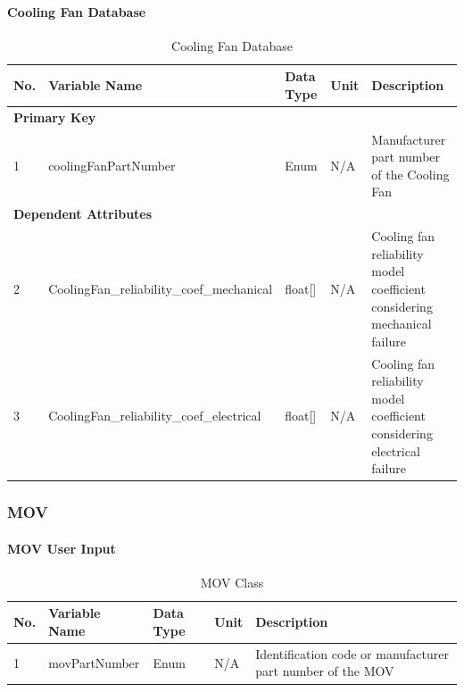 \documentclass{article}
\begin{document}
\paragraph{Cooling Fan Database}
\begin{table}[h]
\centering
\caption{Cooling Fan Database}
\begin{tabular}{|l|l|l|l|p{6cm}|}
\hline
\textbf{No.} & \textbf{Variable Name} & \textbf{Data Type} & \textbf{Unit} & \textbf{Description} \\ \hline
\multicolumn{5}{|l|}{\textbf{Primary Key}} \\ \hline
1 & coolingFanPartNumber & Enum & N/A & Manufacturer part number of the Cooling Fan \\ \hline
\multicolumn{5}{|l|}{\textbf{Dependent Attributes}} \\ \hline
2 & CoolingFan\_reliability\_coef\_mechanical & float[] & N/A & Cooling fan reliability model coefficient considering mechanical failure \\ \hline
3 & CoolingFan\_reliability\_coef\_electrical & float[] & N/A & Cooling fan reliability model coefficient considering electrical failure \\ \hline
\end{tabular}
\end{table}

\subsubsection{MOV}
\paragraph{MOV User Input}
\begin{table}[h]
\centering
\caption{MOV Class}
\begin{tabular}{|l|l|l|l|p{6cm}|}
\hline
\textbf{No.} & \textbf{Variable Name} & \textbf{Data Type} & \textbf{Unit} & \textbf{Description} \\ \hline
1 & movPartNumber & Enum & N/A & Identification code or manufacturer part number of the MOV \\ \hline
\end{tabular}
\end{table}
\end{document}
